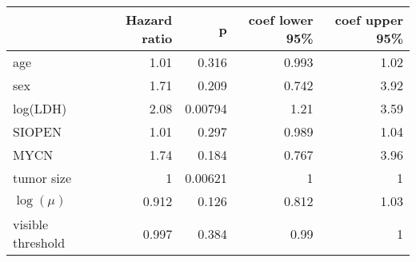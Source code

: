 \begin{tabular}{lrrrr}
\toprule
{} &  Hazard ratio &       p &  coef lower 95\% &  coef upper 95\% \\
\midrule
age               &          1.01 &   0.316 &            0.993 &             1.02 \\
sex               &          1.71 &   0.209 &            0.742 &             3.92 \\
log(LDH)          &          2.08 & 0.00794 &             1.21 &             3.59 \\
SIOPEN            &          1.01 &   0.297 &            0.989 &             1.04 \\
MYCN              &          1.74 &   0.184 &            0.767 &             3.96 \\
tumor size        &             1 & 0.00621 &                1 &                1 \\
$\log(\mu)$       &         0.912 &   0.126 &            0.812 &             1.03 \\
visible threshold &         0.997 &   0.384 &             0.99 &                1 \\
\bottomrule
\end{tabular}

